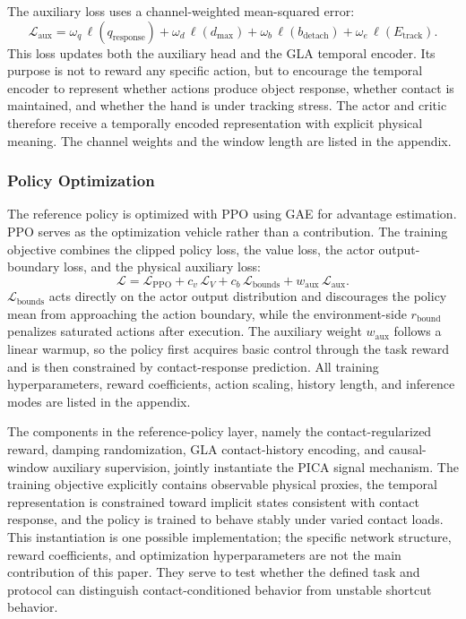 \documentclass{llmxive}
\begin{document}
The auxiliary loss uses a channel-weighted mean-squared error:
\begin{equation}
\mathcal{L}_{\mathrm{aux}} =
\omega_q\,\ell(q_{\mathrm{response}})
+ \omega_d\,\ell(d_{\max})
+ \omega_b\,\ell(b_{\mathrm{detach}})
+ \omega_e\,\ell(E_{\mathrm{track}}).
\label{eq:laux}
\end{equation}
This loss updates both the auxiliary head and the GLA temporal
encoder. Its purpose is not to reward any specific action, but to
encourage the temporal encoder to represent whether actions produce
object response, whether contact is maintained, and whether the hand
is under tracking stress. The actor and critic therefore receive a
temporally encoded representation with explicit physical meaning.
The channel weights and the window length are listed in the
appendix.


\subsubsection{Policy Optimization}
\label{sec:opt}

The reference policy is optimized with PPO using GAE for advantage
estimation. PPO serves as the optimization vehicle rather than a
contribution. The training objective combines the clipped policy
loss, the value loss, the actor output-boundary loss, and the
physical auxiliary loss:
\begin{equation}
\mathcal{L} = \mathcal{L}_{\mathrm{PPO}}
+ c_v\,\mathcal{L}_V
+ c_b\,\mathcal{L}_{\mathrm{bounds}}
+ w_{\mathrm{aux}}\,\mathcal{L}_{\mathrm{aux}}.
\label{eq:opt}
\end{equation}
$\mathcal{L}_{\mathrm{bounds}}$ acts directly on the actor output
distribution and discourages the policy mean from approaching the
action boundary, while the environment-side $r_{\mathrm{bound}}$
penalizes saturated actions after execution.
The auxiliary weight $w_{\mathrm{aux}}$ follows a linear warmup, so
the policy first acquires basic control through the task reward and
is then constrained by contact-response prediction. All training
hyperparameters, reward coefficients, action scaling, history
length, and inference modes are listed in the appendix.

The components in the reference-policy layer, namely the
contact-regularized reward, damping randomization, GLA
contact-history encoding, and causal-window auxiliary supervision,
jointly instantiate the PICA signal mechanism. The training
objective explicitly contains observable physical proxies, the
temporal representation is constrained toward implicit states
consistent with contact response, and the policy is trained to
behave stably under varied contact loads. This instantiation is one
possible implementation; the specific network structure, reward
coefficients, and optimization hyperparameters are not the main
contribution of this paper. They serve to test whether the defined
task and protocol can distinguish contact-conditioned behavior from
unstable shortcut behavior.
\end{document}
